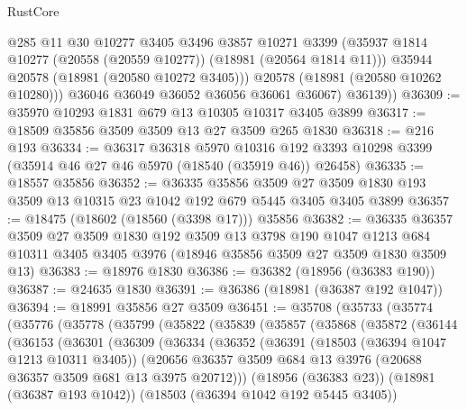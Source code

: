\begin{lexlean}{RustCore}
\begin{coremodule}
              @285
              @11
              @30
              @10277
              @3405
              @3496
              @3857
              @10271
              @3399
              (@35937 @1814 @10277 (@20558 (@20559 @10277)) (@18981 (@20564 @1814 @11)))
              @35944
              @20578
              (@18981 (@20580 @10272 @3405)))
            @20578
            (@18981 (@20580 @10262 @10280)))
          @36046
          @36049
          @36052
          @36056
          @36061
          @36067)
        @36139))
@36309 := @35970 @10293 @1831 @679 @13 @10305 @10317 @3405 @3899
@36317 := @18509 @35856 @3509 @3509 @13 @27 @3509 @265 @1830
@36318 := @216 @193
@36334 := @36317
    @36318
    @5970
    @10316
    @192
    @3393
    @10298
    @3399
    (@35914 @46 @27 @46 @5970 (@18540 (@35919 @46)) @26458)
@36335 := @18557 @35856
@36352 := @36335
    @35856
    @3509
    @27
    @3509
    @1830
    @193
    @3509
    @13
    @10315
    @23
    @1042
    @192
    @679
    @5445
    @3405
    @3405
    @3899
@36357 := @18475 (@18602 (@18560 (@3398 @17))) @35856
@36382 := @36335
    @36357
    @3509
    @27
    @3509
    @1830
    @192
    @3509
    @13
    @3798
    @190
    @1047
    @1213
    @684
    @10311
    @3405
    @3405
    @3976
    (@18946 @35856 @3509 @27 @3509 @1830 @3509 @13)
@36383 := @18976 @1830
@36386 := @36382 (@18956 (@36383 @190))
@36387 := @24635 @1830
@36391 := @36386 (@18981 (@36387 @192 @1047))
@36394 := @18991 @35856 @27 @3509
@36451 := @35708
    (@35733
      (@35774
        (@35776
          (@35778
            (@35799
              (@35822
                (@35839
                  (@35857
                    (@35868
                      (@35872
                        (@36144
                          (@36153
                            (@36301
                              (@36309
                                (@36334
                                  (@36352
                                    (@36391
                                      (@18503 (@36394 @1047 @1213 @10311 @3405))
                                      (@20656
                                        @36357
                                        @3509
                                        @684
                                        @13
                                        @3976
                                        (@20688 @36357 @3509 @681 @13 @3975 @20712)))
                                    (@18956 (@36383 @23))
                                    (@18981 (@36387 @193 @1042))
                                    (@18503 (@36394 @1042 @192 @5445 @3405))

\end{coremodule}
\end{lexlean}
